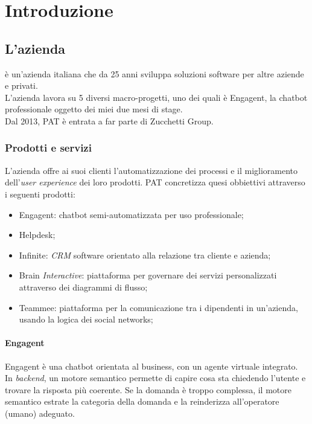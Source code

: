 
\chapter{Introduzione}
\label{cap:introduzione}
\section{L'azienda}

\company è un'azienda italiana che da 25 anni sviluppa soluzioni software per altre aziende e privati.\\
L'azienda lavora su 5 diversi macro-progetti, uno dei quali è Engagent, la chatbot professionale oggetto dei miei due mesi di stage.\\
Dal 2013, PAT è entrata a far parte di Zucchetti Group.

\subsection{Prodotti e servizi}
L'azienda offre ai suoi clienti l'automatizzazione dei processi e il miglioramento dell'\textit{user experience} dei loro prodotti.
PAT concretizza quesi obbiettivi attraverso i seguenti prodotti:
\begin{itemize}
    \item Engagent: chatbot semi-automatizzata per uso professionale; 
    \item Helpdesk;
    \item Infinite: \textit{CRM} software orientato alla relazione tra cliente e azienda;
    \item Brain \textit{Interactive}: piattaforma per governare dei servizi personalizzati attraverso dei diagrammi di flusso; 
    \item Teammee: piattaforma per la comunicazione tra i dipendenti in un'azienda, usando la logica dei social networks;
\end{itemize}

\subsubsection{Engagent}
Engagent è una chatbot orientata al business, con un agente virtuale integrato.\\
In \textit{backend}, un motore semantico permette di capire cosa sta chiedendo l'utente e trovare la risposta più coerente. Se la domanda è troppo complessa, il motore semantico estrate la categoria della domanda e la reinderizza all'operatore (umano) adeguato.\\


